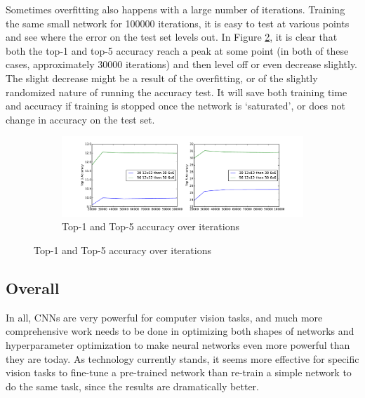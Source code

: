 \documentclass[10pt]{article}
\begin{document}
Sometimes overfitting also happens with a large number of iterations. Training the same small network for 100000 iterations, it is easy to test at various points and see where the error on the test set levels out. In Figure \ref{fig:accuracyovertime}, it is clear that both the top-1 and top-5 accuracy reach a peak at some point (in both of these cases, approximately 30000 iterations) and then level off or even decrease slightly. The slight decrease might be a result of the overfitting, or of the slightly randomized nature of running the accuracy test. It will save both training time and accuracy if training is stopped once the network is `saturated', or does not change in accuracy on the test set.

\begin{figure}[!ht]
\centering
\begin{subfigure}[t]{0.8\textwidth}
	\centering
	\includegraphics[width=\textwidth]{accuracy_over_iterations.pdf}
	\caption{Top-1 and Top-5 accuracy over iterations}
	\label{fig:accuracyovertime}
\end{subfigure}
\end{figure}


\subsection{Overall}

In all, CNNs are very powerful for computer vision tasks, and much more comprehensive work needs to be done in optimizing both shapes of networks and hyperparameter optimization to make neural networks even more powerful than they are today. As technology currently stands, it seems more effective for specific vision tasks to fine-tune a pre-trained network than re-train a simple network to do the same task, since the results are dramatically better.



\end{document}

